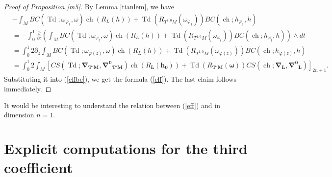\documentclass[12pt,reqno,a4paper]{amsart}
\numberwithin{equation}{section}
\def\p{\partial}
\DeclareMathOperator{\Td}{Td}
\DeclareMathOperator{\ch}{ch}
\theoremstyle{remark}
\theoremstyle{dotless}
\begin{document}
\begin{proof}[Proof of Proposition \ref{m5}]
By Lemma \ref{tianlem}, we have
\begin{align*}
&-\int_M BC(\Td;\omega_{\varphi_1},\omega)\ch(R_{L}(h))+\Td(R_{T^{1,0}M}(\omega_{\varphi_1}))BC(\ch;h_{\varphi_1},h)\\
&=-\int_0^1 \frac{\p}{\p t}\left( \int_M BC(\Td;\omega_{\varphi_t},\omega)\ch(R_{L}(h))+\Td(R_{T^{1,0}M}(\omega_{\varphi_t}))BC(\ch;h_{\varphi_t},h)\right)\wedge dt\\
&=\int_0^1 2 \p_z \int_M BC(\Td;\omega_{\varphi(z)},\omega)\ch(R_{L}(h))+\Td(R_{T^{1,0}M}(\omega_{\varphi(z)}))BC(\ch;h_{\varphi(z)},h)\\
&=\int_0^1 2\int_M \left[ CS(\Td;\boldsymbol{\nabla}_\mathbf{T'M},\boldsymbol{\nabla^0}_\mathbf{T'M})\ch(R_\mathbf{L}(\mathbf{h_0}))+\Td(R_{\mathbf{T'M}}(\boldsymbol{\omega}))CS(\ch;\boldsymbol{\nabla}_\mathbf{L},\boldsymbol{\nabla^0}_\mathbf{L})\right]_{2n+1}.
\end{align*}
Substituting it into (\ref{effbc}), we get the formula (\ref{eff}). The last claim follows immediately.
\end{proof}

It would be interesting to understand the relation between (\ref{eff}) and \cite[Theorem 3]{klevtsov2017quantum} in dimension $n=1$.

\appendix \section{Explicit computations for the third coefficient}\label{appendix}
\end{document}
